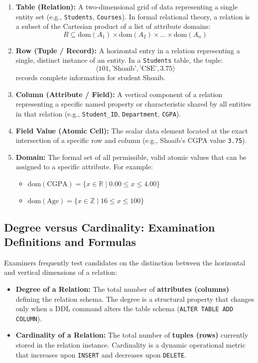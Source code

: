 \begin{enumerate}
\item \textbf{Table (Relation):} A two-dimensional grid of data representing a single entity set (e.g., \texttt{Students}, \texttt{Courses}). In formal relational theory, a relation is a subset of the Cartesian product of a list of attribute domains:
\[ R \subseteq \text{dom}(A_1) \times \text{dom}(A_2) \times \dots \times \text{dom}(A_n) \]
\item \textbf{Row (Tuple / Record):} A horizontal entry in a relation representing a single, distinct instance of an entity. In a \texttt{Students} table, the tuple:
\[ \langle 101, \text{'Shoaib'}, \text{'CSE'}, 3.75 \rangle \]
records complete information for student Shoaib.
\item \textbf{Column (Attribute / Field):} A vertical component of a relation representing a specific named property or characteristic shared by all entities in that relation (e.g., \texttt{Student\_ID}, \texttt{Department}, \texttt{CGPA}).
\item \textbf{Field Value (Atomic Cell):} The scalar data element located at the exact intersection of a specific row and column (e.g., Shoaib's CGPA value \texttt{3.75}).
\item \textbf{Domain:} The formal set of all permissible, valid atomic values that can be assigned to a specific attribute. For example:
\begin{itemize}
\item $\text{dom}(\text{CGPA}) = \{ x \in \mathbb{R} \mid 0.00 \le x \le 4.00 \}$
\item $\text{dom}(\text{Age}) = \{ x \in \mathbb{Z} \mid 16 \le x \le 100 \}$
\end{itemize}
\end{enumerate}

\subsection{Degree versus Cardinality: Examination Definitions and Formulas}

Examiners frequently test candidates on the distinction between the horizontal and vertical dimensions of a relation:

\begin{itemize}
\item \textbf{Degree of a Relation:} The total number of \textbf{attributes (columns)} defining the relation schema. The degree is a structural property that changes only when a DDL command alters the table schema (\texttt{ALTER TABLE ADD COLUMN}).
\item \textbf{Cardinality of a Relation:} The total number of \textbf{tuples (rows)} currently stored in the relation instance. Cardinality is a dynamic operational metric that increases upon \texttt{INSERT} and decreases upon \texttt{DELETE}.
\end{itemize}

